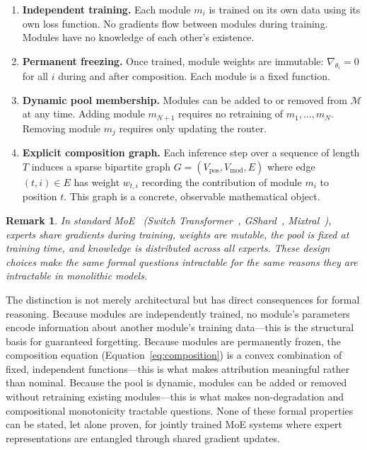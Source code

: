 \documentclass[11pt,a4paper]{article}
\newtheorem{remark}{Remark}
\begin{document}
\begin{enumerate}[nosep,leftmargin=*]
  \item \textbf{Independent training.} Each module $m_i$ is trained on its own data using its own loss function. No gradients flow between modules during training. Modules have no knowledge of each other's existence.
  
  \item \textbf{Permanent freezing.} Once trained, module weights are immutable: $\nabla_{\theta_i} = 0$ for all $i$ during and after composition. Each module is a fixed function.
  
  \item \textbf{Dynamic pool membership.} Modules can be added to or removed from $\mathcal{M}$ at any time. Adding module $m_{N+1}$ requires no retraining of $m_1, \ldots, m_N$. Removing module $m_j$ requires only updating the router.
  
  \item \textbf{Explicit composition graph.} Each inference step over a sequence of length $T$ induces a sparse bipartite graph $G = (V_{\text{pos}}, V_{\text{mod}}, E)$ where edge $(t, i) \in E$ has weight $w_{t,i}$ recording the contribution of module $m_i$ to position $t$. This graph is a concrete, observable mathematical object.
\end{enumerate}

\begin{remark}
In standard MoE~\cite{shazeer2017outrageously} (Switch Transformer~\cite{fedus2022switch}, GShard~\cite{lepikhin2021gshard}, Mixtral~\cite{jiang2024mixtral}), experts share gradients during training, weights are mutable, the pool is fixed at training time, and knowledge is distributed across all experts. These design choices make the same formal questions intractable for the same reasons they are intractable in monolithic models.
\end{remark}

\noindent The distinction is not merely architectural but has direct consequences for formal reasoning. Because modules are independently trained, no module's parameters encode information about another module's training data---this is the structural basis for guaranteed forgetting. Because modules are permanently frozen, the composition equation (Equation~\ref{eq:composition}) is a convex combination of fixed, independent functions---this is what makes attribution meaningful rather than nominal. Because the pool is dynamic, modules can be added or removed without retraining existing modules---this is what makes non-degradation and compositional monotonicity tractable questions. None of these formal properties can be stated, let alone proven, for jointly trained MoE systems where expert representations are entangled through shared gradient updates.
\end{document}
